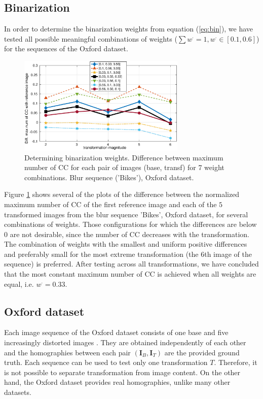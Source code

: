 \documentclass[conference,compsoc]{IEEEtran}
\def\I{{\mathbf I}}
\begin{document}
\subsection{Binarization}
In order to determine the binarization weights from equation (\ref{eq:bin}), we have tested all possible meaningful combinations of weights ($\sum w^{\cdot} =1, w^{\cdot} \in [0.1,0.6] $) for the sequences of the Oxford dataset.
\begin{figure}[htb]
\centering
\begin{minipage}[b]{.99\linewidth}
  \centering
  \centerline{\includegraphics[width=8cm]{diff_num_cc_bin}}
\end{minipage}
\hfill
\caption{Determining binarization weights. Difference between maximum number of CC for each pair of images (base, transf) for 7 weight combinations. Blur sequence ('Bikes'), Oxford dataset.}
\label{fig:bin_bikes}
%
\end{figure}

Figure \ref{fig:bin_bikes} shows several of the plots of the difference between the normalized maximum number of CC of the first reference image and each of the $5$ transformed images from the blur sequence 'Bikes', Oxford dataset, for several combinations of weights. Those configurations for which the differences are below $0$ are not desirable, since the number of CC decreases with the transformation. The combination of weights with the smallest and uniform positive differences and preferably small for the most extreme transformation (the $6$th image of the sequence) is preferred. After testing across all transformations, we have concluded that the most constant maximum number of CC is achieved when all weights are equal, i.e.  $w^{\cdot}=0.33$. 

\subsection{Oxford dataset}
\label{ssec:oxford}
Each image sequence of the Oxford dataset consists of one base and five increasingly distorted images \cite{Mikolajczyk:2005}. They are obtained independently of each other and the homographies between each pair $(\I_B,\I_T)$ are the provided  ground truth. Each sequence can be used to test only one transformation $T$. Therefore, it is not possible to separate transformation from image content. On the other hand, the Oxford dataset provides real homographies, unlike many other datasets.
\end{document}

